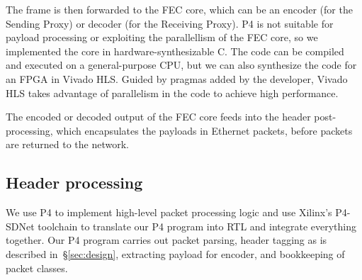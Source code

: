 The frame is then forwarded to the FEC core, which can be an encoder (for the Sending Proxy) or decoder (for the
Receiving Proxy).
P4 is not suitable
for
payload processing or
exploiting the parallellism of the FEC core, so we implemented the core in
hardware-synthesizable C. The code can be compiled and executed on a
general-purpose CPU, but we can also synthesize the code for an FPGA
in Vivado HLS.  Guided by pragmas added by the developer, Vivado HLS takes
advantage of parallelism in the code to 
achieve  high performance.

The encoded or decoded output of the FEC core feeds into the header
post-processing, which encapsulates the payloads in Ethernet packets, before packets are returned to the network.

\subsection{Header processing}
\label{sec:impl:header-processing}
We use P4 to implement high-level packet processing logic and
use Xilinx's P4-SDNet toolchain to translate our P4 program into RTL
and integrate everything together.
%
%
%
%
Our P4 program carries out packet parsing, header tagging as is
described in~\S\ref{sec:design}, extracting payload for encoder, and
bookkeeping of packet classes.

